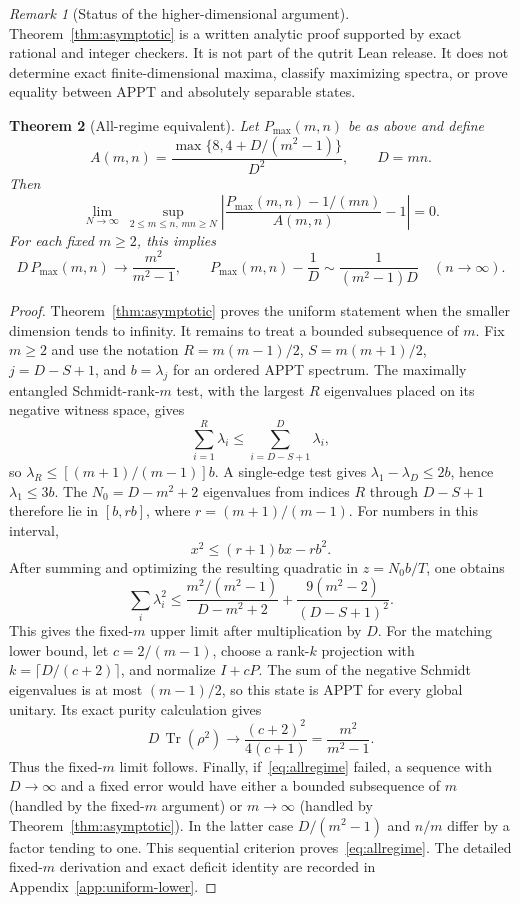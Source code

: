 \documentclass[11pt]{article}
\newtheorem{theorem}{Theorem}[section]
\theoremstyle{remark}\newtheorem{remark}[theorem]{Remark}
\newcommand{\Tr}{\operatorname{Tr}}
\begin{document}
\begin{remark}[Status of the higher-dimensional argument]
Theorem~\ref{thm:asymptotic} is a written analytic proof supported by exact rational and integer checkers. It is not part of the qutrit Lean release. It does not determine exact finite-dimensional maxima, classify maximizing spectra, or prove equality between APPT and absolutely separable states.
\end{remark}

\begin{theorem}[All-regime equivalent]\label{thm:allregime}
Let $P_{\max}(m,n)$ be as above and define
\[
 A(m,n)=\frac{\max\{8,4+D/(m^2-1)\}}{D^2},\qquad D=mn.
\]
Then
\begin{equation}\label{eq:allregime}
 \lim_{N\to\infty}\ \sup_{2\leq m\leq n,\,mn\geq N}
 \left|\frac{P_{\max}(m,n)-1/(mn)}{A(m,n)}-1\right|=0.
\end{equation}
For each fixed $m\geq2$, this implies
\[
 D\,P_{\max}(m,n)\longrightarrow\frac{m^2}{m^2-1},
 \qquad
 P_{\max}(m,n)-\frac1D\sim\frac1{(m^2-1)D}
 \quad(n\to\infty).
\]
\end{theorem}

\begin{proof}
Theorem~\ref{thm:asymptotic} proves the uniform statement when the smaller dimension tends to infinity. It remains to treat a bounded subsequence of $m$. Fix $m\geq2$ and use the notation $R=m(m-1)/2$, $S=m(m+1)/2$, $j=D-S+1$, and $b=\lambda_j$ for an ordered APPT spectrum. The maximally entangled Schmidt-rank-$m$ test, with the largest $R$ eigenvalues placed on its negative witness space, gives
\[
 \sum_{i=1}^R\lambda_i\leq\sum_{i=D-S+1}^{D}\lambda_i,
\]
so $\lambda_R\leq[(m+1)/(m-1)]b$. A single-edge test gives $\lambda_1-\lambda_D\leq2b$, hence $\lambda_1\leq3b$. The $N_0=D-m^2+2$ eigenvalues from indices $R$ through $D-S+1$ therefore lie in $[b,rb]$, where $r=(m+1)/(m-1)$. For numbers in this interval,
\[
 x^2\leq(r+1)bx-rb^2.
\]
After summing and optimizing the resulting quadratic in $z=N_0b/T$, one obtains
\[
 \sum_i\lambda_i^2\leq\frac{m^2/(m^2-1)}{D-m^2+2}
 +\frac{9(m^2-2)}{(D-S+1)^2}.
\]
This gives the fixed-$m$ upper limit after multiplication by $D$. For the matching lower bound, let $c=2/(m-1)$, choose a rank-$k$ projection with $k=\lceil D/(c+2)\rceil$, and normalize $I+cP$. The sum of the negative Schmidt eigenvalues is at most $(m-1)/2$, so this state is APPT for every global unitary. Its exact purity calculation gives
\[
 D\,\Tr(\rho^2)\longrightarrow\frac{(c+2)^2}{4(c+1)}=\frac{m^2}{m^2-1}.
\]
Thus the fixed-$m$ limit follows. Finally, if~\eqref{eq:allregime} failed, a sequence with $D\to\infty$ and a fixed error would have either a bounded subsequence of $m$ (handled by the fixed-$m$ argument) or $m\to\infty$ (handled by Theorem~\ref{thm:asymptotic}). In the latter case $D/(m^2-1)$ and $n/m$ differ by a factor tending to one. This sequential criterion proves~\eqref{eq:allregime}. The detailed fixed-$m$ derivation and exact deficit identity are recorded in Appendix~\ref{app:uniform-lower}.
\end{proof}
\end{document}
